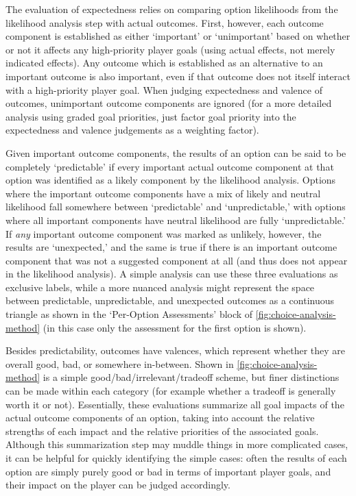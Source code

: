 The evaluation of expectedness relies on comparing option likelihoods from the likelihood analysis step with actual outcomes.
%
First, however, each outcome component is established as either `important' or `unimportant' based on whether or not it affects any high-priority player goals (using actual effects, not merely indicated effects).
%
Any outcome which is established as an alternative to an important outcome is also important, even if that outcome does not itself interact with a high-priority player goal.
%
When judging expectedness and valence of outcomes, unimportant outcome components are ignored (for a more detailed analysis using graded goal priorities, just factor goal priority into the expectedness and valence judgements as a weighting factor).


Given important outcome components, the results of an option can be said to be completely `predictable' if every important actual outcome component at that option was identified as a likely component by the likelihood analysis.
%
Options where the important outcome components have a mix of likely and neutral likelihood fall somewhere between `predictable' and `unpredictable,' with options where all important components have neutral likelihood are fully `unpredictable.'
%
If \emph{any} important outcome component was marked as unlikely, however, the results are `unexpected,' and the same is true if there is an important outcome component that was not a suggested component at all (and thus does not appear in the likelihood analysis).
%
A simple analysis can use these three evaluations as exclusive labels, while a more nuanced analysis might represent the space between predictable, unpredictable, and unexpected outcomes as a continuous triangle as shown in the `Per-Option Assessments' block of \cref{fig:choice-analysis-method} (in this case only the assessment for the first option is shown).


Besides predictability, outcomes have valences, which represent whether they are overall good, bad, or somewhere in-between.
%
Shown in \cref{fig:choice-analysis-method} is a simple good/bad/irrelevant/tradeoff scheme, but finer distinctions can be made within each category (for example whether a tradeoff is generally worth it or not).
%
Essentially, these evaluations summarize all goal impacts of the actual outcome components of an option, taking into account the relative strengths of each impact and the relative priorities of the associated goals.
%
Although this summarization step may muddle things in more complicated cases, it can be helpful for quickly identifying the simple cases: often the results of each option are simply purely good or bad in terms of important player goals, and their impact on the player can be judged accordingly.


